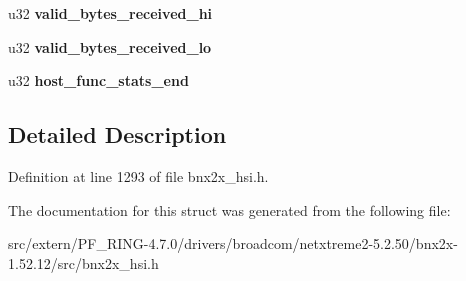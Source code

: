 \begin{DoxyCompactItemize}
\item 
\hypertarget{structhost__func__stats_af0a2248088edfd55caa4df7f834c4625}{
u32 {\bfseries valid\_\-bytes\_\-received\_\-hi}}
\label{structhost__func__stats_af0a2248088edfd55caa4df7f834c4625}

\item 
\hypertarget{structhost__func__stats_a2b159dc57370e73aa11eb17423cce619}{
u32 {\bfseries valid\_\-bytes\_\-received\_\-lo}}
\label{structhost__func__stats_a2b159dc57370e73aa11eb17423cce619}

\item 
\hypertarget{structhost__func__stats_a1fb8f4b40b2c057a9db04d69f7e7ee54}{
u32 {\bfseries host\_\-func\_\-stats\_\-end}}
\label{structhost__func__stats_a1fb8f4b40b2c057a9db04d69f7e7ee54}

\end{DoxyCompactItemize}


\subsection{Detailed Description}


Definition at line 1293 of file bnx2x\_\-hsi.h.



The documentation for this struct was generated from the following file:\begin{DoxyCompactItemize}
\item 
src/extern/PF\_\-RING-\/4.7.0/drivers/broadcom/netxtreme2-\/5.2.50/bnx2x-\/1.52.12/src/bnx2x\_\-hsi.h\end{DoxyCompactItemize}
